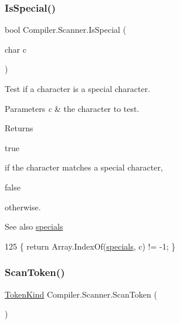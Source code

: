 \subsubsection{\texorpdfstring{Is\+Special()}{IsSpecial()}}
{\footnotesize\ttfamily bool Compiler.\+Scanner.\+Is\+Special (\begin{DoxyParamCaption}\item[{char}]{c }\end{DoxyParamCaption})\hspace{0.3cm}{\ttfamily [protected]}}

Test if a character is a special character. 
\begin{DoxyParams}{Parameters}
{\em c} & the character to test. \\
\hline
\end{DoxyParams}
\begin{DoxyReturn}{Returns}

\begin{DoxyCode}
\textcolor{keyword}{true} 
\end{DoxyCode}
 if the character matches a special character,
\begin{DoxyCode}
\textcolor{keyword}{false} 
\end{DoxyCode}
 otherwise. 
\end{DoxyReturn}
\begin{DoxySeeAlso}{See also}
\mbox{\hyperlink{class_compiler_1_1_scanner_ab3e4b27f11afa6d99ec2f09e8ab0b8bd}{specials}} 
\end{DoxySeeAlso}

\begin{DoxyCode}
125 \{ \textcolor{keywordflow}{return} Array.IndexOf(\mbox{\hyperlink{class_compiler_1_1_scanner_ab3e4b27f11afa6d99ec2f09e8ab0b8bd}{specials}}, c) != -1; \}
\end{DoxyCode}
\mbox{\label{class_compiler_1_1_scanner_a373e66b40365f842b514f388c0becb61}} 
\subsubsection{\texorpdfstring{Scan\+Token()}{ScanToken()}}
{\footnotesize\ttfamily \mbox{\hyperlink{namespace_compiler_a57929962f25004759596fc3f13cf563c}{Token\+Kind}} Compiler.\+Scanner.\+Scan\+Token (\begin{DoxyParamCaption}{ }\end{DoxyParamCaption})\hspace{0.3cm}{\ttfamily [private]}}

